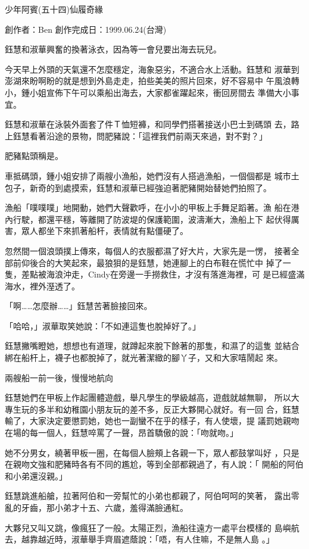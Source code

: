 



少年阿賓(五十四)仙履奇緣

創作者：Ben
創作完成日：1999.06.24(台灣)


鈺慧和淑華興奮的換著泳衣，因為等一會兒要出海去玩兒。

今天早上外頭的天氣還不怎麼穩定，海象惡劣，不適合水上活動。鈺慧和
淑華到澎湖來盼啊盼的就是想到外島走走，拍些美美的照片回來，好不容易中
午風浪轉小，鍾小姐宣佈下午可以乘船出海去，大家都雀躍起來，衝回房間去
準備大小事宜。

鈺慧和淑華在泳裝外面套了件Ｔ恤短褲，和同學們搭著接送小巴士到碼頭
去，路上鈺慧看著沿途的景物，問肥豬說：「這裡我們前兩天來過，對不對？」

肥豬點頭稱是。

車抵碼頭，鍾小姐安排了兩艘小漁船，她們沒有人搭過漁船，一個個都是
城市土包子，新奇的到處摸索，鈺慧和淑華已經強迫著肥豬開始替她們拍照了。

漁船「噗噗噗」地開動，她們大聲歡呼，在小小的甲板上手舞足蹈著。漁
船在港內行駛，都還平穩，等離開了防波堤的保護範圍，波濤漸大，漁船上下
起伏得厲害，眾人都坐下來抓著船杆，表情就有點僵硬了。

忽然間一個浪頭撲上傳來，每個人的衣服都濕了好大片，大家先是一愣，
接著全部前仰後合的大笑起來，最狼狽的是鈺慧，她連腳上的白布鞋在慌忙中
掉了一隻，差點被海浪沖走，Cindy在旁邊一手撈救住，才沒有落進海裡，可
是已經盛滿海水，裡外溼透了。

「啊……怎麼辦……」鈺慧苦著臉接回來。

「哈哈，」淑華取笑她說：「不如連這隻也脫掉好了。」

鈺慧撇嘴瞪她，想想也有道理，就蹲起來脫下餘著的那隻，和濕了的這隻
並結合綁在船杆上，襪子也都脫掉了，就光著潔緻的腳丫子，又和大家嘻鬧起
來。

兩艘船一前一後，慢慢地航向

鈺慧她們在甲板上作起團體遊戲，舉凡學生的學級越高，遊戲就越無聊，
所以大專生玩的多半和幼稚園小朋友玩的差不多，反正大夥開心就好。有一回
合，鈺慧輸了，大家決定要懲罰她，她也一副蠻不在乎的樣子，有人使壞，提
議罰她親吻在場的每一個人，鈺慧啐罵了一聲，昂首驕傲的說：「吻就吻。」

她不分男女，繞著甲板一圈，在每個人臉頰上各親一下，眾人都鼓掌叫好
，只是在親吻文強和肥豬時各有不同的尷尬，等到全部都親過了，有人說：「
開船的阿伯和小弟還沒親。」

鈺慧跳進船艙，拉著阿伯和一旁幫忙的小弟也都親了，阿伯呵呵的笑著，
露出零亂的牙齒，那小弟才十五、六歲，羞得滿臉通紅。

大夥兒又叫又跳，像瘋狂了一般。太陽正烈，漁船往遠方一處平台模樣的
島嶼航去，越靠越近時，淑華舉手齊眉遮蔭說：「唔，有人住嘛，不是無人島
。」

